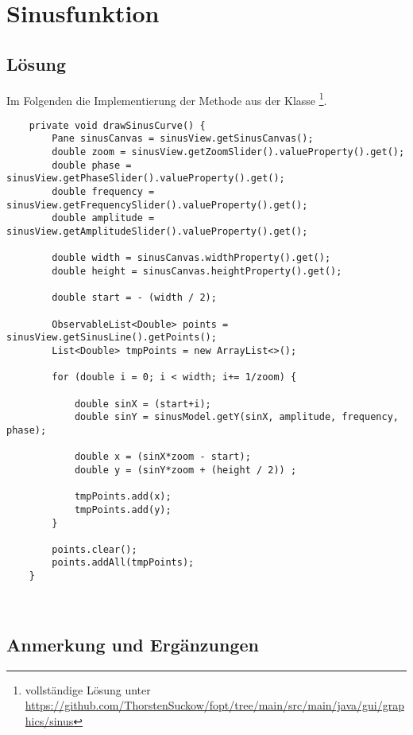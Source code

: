 \usepackage{lstmisc}\section{Sinusfunktion}\label{ch:sinusfunktion}


\subsection{Lösung}

Im Folgenden die Implementierung der Methode  aus der Klasse \footnote{
    vollständige Lösung unter \url{https://github.com/ThorstenSuckow/fopt/tree/main/src/main/java/gui/graphics/sinus}
}.

\begin{verbatim}
    private void drawSinusCurve() {
        Pane sinusCanvas = sinusView.getSinusCanvas();
        double zoom = sinusView.getZoomSlider().valueProperty().get();
        double phase = sinusView.getPhaseSlider().valueProperty().get();
        double frequency = sinusView.getFrequencySlider().valueProperty().get();
        double amplitude = sinusView.getAmplitudeSlider().valueProperty().get();

        double width = sinusCanvas.widthProperty().get();
        double height = sinusCanvas.heightProperty().get();

        double start = - (width / 2);

        ObservableList<Double> points = sinusView.getSinusLine().getPoints();
        List<Double> tmpPoints = new ArrayList<>();

        for (double i = 0; i < width; i+= 1/zoom) {

            double sinX = (start+i);
            double sinY = sinusModel.getY(sinX, amplitude, frequency, phase);

            double x = (sinX*zoom - start);
            double y = (sinY*zoom + (height / 2)) ;

            tmpPoints.add(x);
            tmpPoints.add(y);
        }

        points.clear();
        points.addAll(tmpPoints);
    }
\end{verbatim}\\


\subsection{Anmerkung und Ergänzungen}

